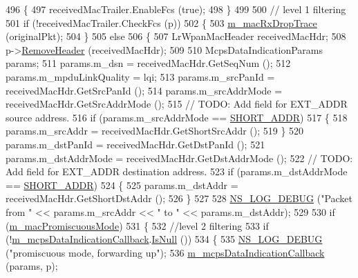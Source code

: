 \begin{DoxyCode}
496     \{
497       receivedMacTrailer.EnableFcs (\textcolor{keyword}{true});
498     \}
499 
500   \textcolor{comment}{// level 1 filtering}
501   \textcolor{keywordflow}{if} (!receivedMacTrailer.CheckFcs (p))
502     \{
503       \hyperlink{classns3_1_1LrWpanMac_ac06545ba350f6e2bc5d771213875bdf6}{m\_macRxDropTrace} (originalPkt);
504     \}
505   \textcolor{keywordflow}{else}
506     \{
507       LrWpanMacHeader receivedMacHdr;
508       p->\hyperlink{classns3_1_1Packet_a0961eccf975d75f902d40956c93ba63e}{RemoveHeader} (receivedMacHdr);
509 
510       McpsDataIndicationParams params;
511       params.m\_dsn = receivedMacHdr.GetSeqNum ();
512       params.m\_mpduLinkQuality = lqi;
513       params.m\_srcPanId = receivedMacHdr.GetSrcPanId ();
514       params.m\_srcAddrMode = receivedMacHdr.GetSrcAddrMode ();
515       \textcolor{comment}{// TODO: Add field for EXT\_ADDR source address.}
516       \textcolor{keywordflow}{if} (params.m\_srcAddrMode == \hyperlink{group__lr-wpan_gga9ea4702ab11d5329e1593afebce06bbba7bf58267dde39bdabfeeb5793450c5e3}{SHORT\_ADDR})
517         \{
518           params.m\_srcAddr = receivedMacHdr.GetShortSrcAddr ();
519         \}
520       params.m\_dstPanId = receivedMacHdr.GetDstPanId ();
521       params.m\_dstAddrMode = receivedMacHdr.GetDstAddrMode ();
522       \textcolor{comment}{// TODO: Add field for EXT\_ADDR destination address.}
523       \textcolor{keywordflow}{if} (params.m\_dstAddrMode == \hyperlink{group__lr-wpan_gga9ea4702ab11d5329e1593afebce06bbba7bf58267dde39bdabfeeb5793450c5e3}{SHORT\_ADDR})
524         \{
525           params.m\_dstAddr = receivedMacHdr.GetShortDstAddr ();
526         \}
527 
528       \hyperlink{group__logging_ga413f1886406d49f59a6a0a89b77b4d0a}{NS\_LOG\_DEBUG} (\textcolor{stringliteral}{"Packet from "} << params.m\_srcAddr << \textcolor{stringliteral}{" to "} << params.m\_dstAddr);
529 
530       \textcolor{keywordflow}{if} (\hyperlink{classns3_1_1LrWpanMac_aaf3802d8a9c98323a662b4e8209144e4}{m\_macPromiscuousMode})
531         \{
532           \textcolor{comment}{//level 2 filtering}
533           \textcolor{keywordflow}{if} (!\hyperlink{classns3_1_1LrWpanMac_ada2124716389b849b2a1f9c8ff64d597}{m\_mcpsDataIndicationCallback}.\hyperlink{classns3_1_1Callback_aa8e27826badbf37f84763f36f70d9b54}{IsNull} ())
534             \{
535               \hyperlink{group__logging_ga413f1886406d49f59a6a0a89b77b4d0a}{NS\_LOG\_DEBUG} (\textcolor{stringliteral}{"promiscuous mode, forwarding up"});
536               \hyperlink{classns3_1_1LrWpanMac_ada2124716389b849b2a1f9c8ff64d597}{m\_mcpsDataIndicationCallback} (params, p);

\end{DoxyCode}
